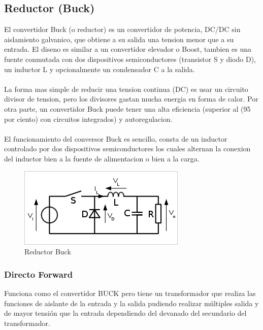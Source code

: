 \documentclass[11pt]{article}
\begin{document}
\subsection{Reductor (Buck)}
El convertidor Buck (o reductor) es un convertidor de potencia, DC/DC sin aislamiento galvanico, que obtiene a su salida una tension menor que a su entrada. El diseno es similar a un convertidor elevador o Boost, tambien es una fuente conmutada con dos dispositivos semiconductores (transistor S y diodo D), un inductor L y opcionalmente un condensador C a la salida.\\\\
La forma mas simple de reducir una tension continua (DC) es usar un circuito divisor de tension, pero los divisores gastan mucha energia en forma de calor. Por otra parte, un convertidor Buck puede tener una alta eficiencia (superior al (95 por ciento) con circuitos integrados) y autoregulacion.\\\\
El funcionamiento del conversor Buck es sencillo, consta de un inductor controlado por dos dispositivos semiconductores los cuales alternan la conexion del inductor bien a la fuente de alimentacion o bien a la carga. 
\begin{figure}[htp]
\centering
\includegraphics[scale=0.60]{Reductor Buck.png}
\caption{Reductor Buck}
\label{}
\end{figure}

\subsubsection{Directo Forward}
Funciona como el convertidor BUCK pero tiene un transformador que realiza las funciones de aislante de la entrada y la salida pudiendo realizar múltiples salida y de mayor tensión que la entrada dependiendo del devanado del secundario del transformador.
\end{document}
